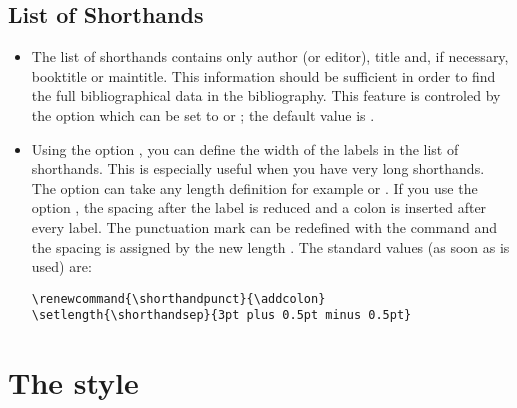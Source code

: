 \documentclass[english]{scrartcl}
\begin{document}
\subsection{List of Shorthands}
\begin{itemize}
	\item The list of shorthands contains only author (or editor), title and,
	      if necessary, booktitle or maintitle. This information should be
	      sufficient in order to find the full bibliographical data in the
	      bibliography. This feature is controled by the
	      option  which can be set to  or
	      ; the default value is .
	\item Using the option , you can define the width of
	      the labels in the list of shorthands. This is especially useful when
	      you have very long shorthands. The option can take any length 
	      definition for example \wert{40pt} or \wert{3em}. \achtung If you use 
	      the option , the spacing after the label is 
	      reduced and a colon is inserted after every label. The punctuation 
	      mark can be redefined with the command  and the 
	      spacing is assigned by the new length . The standard 
	      values (as soon as  is used) are:
				\begin{lstlisting}
\renewcommand{\shorthandpunct}{\addcolon}
\setlength{\shorthandsep}{3pt plus 0.5pt minus 0.5pt}
				\end{lstlisting}
\end{itemize}

\section{The  style}
\end{document}
